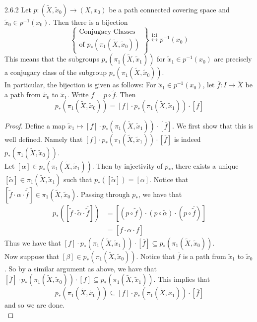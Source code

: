 \documentclass[a4paper]{article}
\begin{document}
\begin{prp}{}{2.6.2} Let $p:(\widetilde{X},\widetilde{x}_0)\to (X,x_0)$ be a path connected covering space and $\widetilde{x}_0\in p^{-1}(x_0)$. Then there is a bijection $$\left\{\substack{\text{Conjugacy Classes}\\\text{of }p_\ast(\pi_1(\widetilde{X},\widetilde{x}_0))}\right\}\overset{\text{1:1}}{\longleftrightarrow} p^{-1}(x_0)$$ This means that the subgroups $p_\ast(\pi_1(\widetilde{X},\widetilde{x}_1))$ for $\widetilde{x}_1\in p^{-1}(x_0)$ are precisely a conjugacy class of the subgroup $p_\ast(\pi_1(\widetilde{X},\widetilde{x}_0))$. \\

In particular, the bijection is given as follows: For $\widetilde{x}_1\in p^{-1}(x_0)$, let $\overline{f}:I\to\widetilde{X}$ be a path from $\widetilde{x}_0$ to $\widetilde{x}_1$. Write $f=p\circ\widetilde{f}$. Then $$p_\ast(\pi_1(\widetilde{X},\widetilde{x}_0))=[f]\cdot p_\ast(\pi_1(\widetilde{X},\widetilde{x}_1))\cdot[\overline{f}]$$ 
\begin{proof}
Define a map $\widetilde{x}_1\mapsto[f]\cdot p_\ast(\pi_1(\widetilde{X},\widetilde{x}_1))\cdot[\overline{f}]$. We first show that this is well defined. Namely that $[f]\cdot p_\ast(\pi_1(\widetilde{X},\widetilde{x}_1))\cdot[\overline{f}]$ is indeed $p_\ast(\pi_1(\widetilde{X},\widetilde{x}_0))$. \\

Let $[\alpha]\in p_\ast(\pi_1(\widetilde{X},\widetilde{x}_1))$. Then by injectivity of $p_\ast$, there exists a unique $[\widetilde{\alpha}]\in\pi_1(\widetilde{X},\widetilde{x}_1)$ such that $p_\ast([\widetilde{\alpha}])=[\alpha]$. Notice that $[\widetilde{f}\cdot\alpha\cdot\overline{\widetilde{f}}]\in\pi_1(\widetilde{X},\widetilde{x}_0)$. Passing through $p_\ast$, we have that 
\begin{align*}
p_\ast\left([\widetilde{f}\cdot\widetilde{\alpha}\cdot\overline{\widetilde{f}}]\right)&=[(p\circ\widetilde{f})\cdot(p\circ\widetilde{\alpha})\cdot(p\circ\overline{\widetilde{f}})]\\
&=[f\cdot\alpha\cdot\overline{f}]
\end{align*}
Thus we have that $[f]\cdot p_\ast(\pi_1(\widetilde{X},\widetilde{x}_1))\cdot[\overline{f}]\subseteq p_\ast(\pi_1(\widetilde{X},\widetilde{x}_0))$. \\

Now suppose that $[\beta]\in p_\ast(\pi_1(\widetilde{X},\widetilde{x}_0))$. Notice that $\overline{f}$ is a path from $\widetilde{x}_1$ to $\widetilde{x}_0$. So by a similar argument as above, we have that $[\overline{f}]\cdot p_\ast(\pi_1(\widetilde{X},\widetilde{x}_0))\cdot[f]\subseteq p_\ast(\pi_1(\widetilde{X},\widetilde{x}_1))$. This implies that $$p_\ast(\pi_1(\widetilde{X},\widetilde{x}_0))\subseteq [f]\cdot p_\ast(\pi_1(\widetilde{X},\widetilde{x}_1))\cdot[\overline{f}]$$ and so we are done. \\


\end{proof}
\end{prp}
\end{document}
